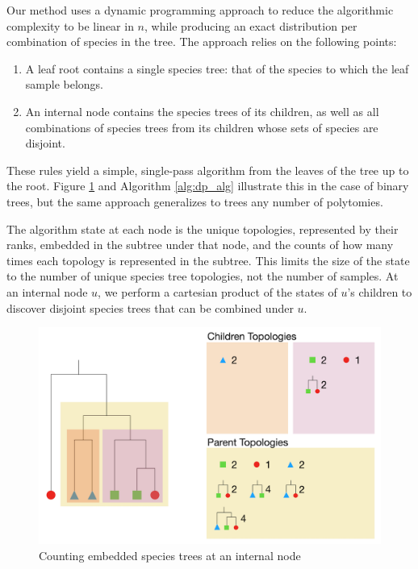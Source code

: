 \documentclass{article}
\begin{document}
Our method uses a dynamic programming approach to reduce the algorithmic
complexity to be linear in $n$, while producing an exact distribution per
combination of species in the tree. The approach relies on the following points:
\begin{enumerate}
    \item A leaf root contains a single species tree: that of the species to
        which the leaf sample belongs.
    \item An internal node contains the species trees of its children, as
        well as all combinations of species trees from its children whose
        sets of species are disjoint.
\end{enumerate}
These rules yield a simple, single-pass algorithm from the leaves of the tree
up to the root. Figure \ref{fig:dp_alg} and Algorithm \ref{alg:dp_alg}
illustrate this in the case of binary trees, but the same approach generalizes
to trees any number of polytomies.

The algorithm state at each node is the unique topologies,
represented by their ranks, embedded in the subtree under that node, and the
counts of how many times each topology is represented in the subtree. This
limits the size of the state to the number of unique species tree topologies,
not the number of samples. At an internal node $u$, we perform a cartesian
product of the states of $u$'s children to discover disjoint species trees that
can be combined under $u$.

\begin{figure}[t]
    \includegraphics[scale=0.5]{dp_alg}
    \centering
    \caption{Counting embedded species trees at an internal node}
    \label{fig:dp_alg}
\end{figure}
\end{document}
